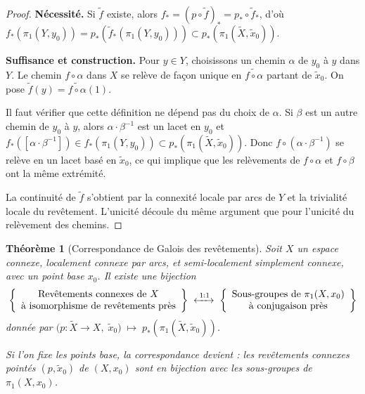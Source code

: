 \documentclass[12pt,a4paper,openany]{book}
\theoremstyle{definition}
\theoremstyle{plain}
\newtheorem{theoreme}[definition]{Théorème}
\theoremstyle{remark}
\begin{document}
\begin{proof}
\textbf{Nécessité.} Si $\tilde{f}$ existe, alors
$f_* = (p \circ \tilde{f})_* = p_* \circ \tilde{f}_*$, d'où
$f_*(\pi_1(Y, y_0)) = p_*(\tilde{f}_*(\pi_1(Y, y_0))) \subset p_*(\pi_1(\widetilde{X}, \tilde{x}_0))$.

\textbf{Suffisance et construction.}
Pour $y \in Y$, choisissons un chemin $\alpha$ de $y_0$ à $y$ dans $Y$. Le chemin
$f \circ \alpha$ dans $X$ se relève de façon unique en $\widetilde{f \circ \alpha}$
partant de $\tilde{x}_0$. On pose $\tilde{f}(y) = \widetilde{f \circ \alpha}(1)$.

Il faut vérifier que cette définition ne dépend pas du choix de $\alpha$. Si $\beta$ est
un autre chemin de $y_0$ à $y$, alors $\alpha \cdot \beta^{-1}$ est un lacet en $y_0$
et $f_*([\alpha \cdot \beta^{-1}]) \in f_*(\pi_1(Y, y_0)) \subset p_*(\pi_1(\widetilde{X}, \tilde{x}_0))$.
Donc $f \circ (\alpha \cdot \beta^{-1})$ se relève en un lacet basé en $\tilde{x}_0$,
ce qui implique que les relèvements de $f \circ \alpha$ et $f \circ \beta$ ont la même extrémité.

La continuité de $\tilde{f}$ s'obtient par la connexité locale par arcs de $Y$ et la trivialité
locale du revêtement. L'unicité découle du même argument que pour l'unicité du relèvement des chemins.
\end{proof}

\begin{theoreme}[{Correspondance de Galois des revêtements}]\label{thm:galois-revetements}
Soit $X$ un espace connexe, localement connexe par arcs, et semi-localement simplement connexe,
avec un point base $x_0$. Il existe une bijection
\[
\left\{
\begin{array}{c}
\text{Revêtements connexes de } X \\
\text{à isomorphisme de revêtements près}
\end{array}
\right\}
\;\xleftrightarrow{\;1:1\;}\;
\left\{
\begin{array}{c}
\text{Sous-groupes de } \pi_1(X, x_0) \\
\text{à conjugaison près}
\end{array}
\right\}
\]
donnée par $\big(p \colon \widetilde{X} \to X,\; \tilde{x}_0\big) \;\longmapsto\; p_*(\pi_1(\widetilde{X}, \tilde{x}_0))$.

Si l'on fixe les points base, la correspondance devient : les revêtements connexes pointés
$(p, \tilde{x}_0)$ de $(X, x_0)$ sont en bijection avec les sous-groupes de $\pi_1(X, x_0)$.
\end{theoreme}
\end{document}
